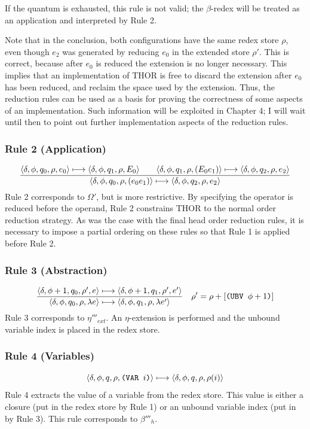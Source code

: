 If the quantum is exhausted, this rule is not valid; the \(\beta\)-redex will be
treated as an application and interpreted by Rule 2.

Note that in the conclusion, both configurations have the same redex store
\(\rho\), even though \(e_2\) was generated by reducing \(e_0\) in the extended
store \(\rho'\). This is correct, because after \(e_0\) is reduced the extension
is no longer necessary. This implies that an implementation of THOR is free to
discard the extension after \(e_0\) has been reduced, and reclaim the space used
by the extension. Thus, the reduction rules can be used as a basis for proving
the correctness of some aspects of an implementation. Such information will be
exploited in Chapter 4; I will wait until then to point out further
implementation aspects of the reduction rules.

\subsubsection*{Rule 2 (Application)}
\[
\frac{
\langle \delta,\phi,q_0,\rho,e_0\rangle\longmapsto
\langle \delta,\phi,q_1,\rho,E_0\rangle
\qquad
\langle \delta,\phi,q_1,\rho,(E_0e_1)\rangle\longmapsto
\langle \delta,\phi,q_2,\rho,e_2\rangle
}{
\langle \delta,\phi,q_0,\rho,(e_0e_1)\rangle\longmapsto
\langle \delta,\phi,q_2,\rho,e_2\rangle
}
\]
Rule 2 corresponds to \(\Omega'\), but is more restrictive. By specifying the
operator is reduced before the operand, Rule 2 constrains THOR to the normal
order reduction strategy. As was the case with the final head order reduction
rules, it is necessary to impose a partial ordering on these rules so that Rule
1 is applied before Rule 2.

\subsubsection*{Rule 3 (Abstraction)}
\[
\frac{
\langle \delta,\phi+1,q_0,\rho',e\rangle\longmapsto
\langle \delta,\phi+1,q_1,\rho',e'\rangle
}{
\langle \delta,\phi,q_0,\rho,\lambda e\rangle\longmapsto
\langle \delta,\phi,q_1,\rho,\lambda e'\rangle
}
\quad
\rho'=\rho+[\texttt{(UBV }\phi+1\texttt{)}]
\]
Rule 3 corresponds to \(\eta'''_{ext}\). An \(\eta\)-extension is performed and
the unbound variable index is placed in the redex store.

\subsubsection*{Rule 4 (Variables)}
\[
\langle \delta,\phi,q,\rho,\texttt{(VAR }i\texttt{)}\rangle\longmapsto
\langle \delta,\phi,q,\rho,\rho(i)\rangle
\]
Rule 4 extracts the value of a variable from the redex store. This value is
either a closure (put in the redex store by Rule 1) or an unbound variable index
(put in by Rule 3). This rule corresponds to \(\beta'''_h\).

